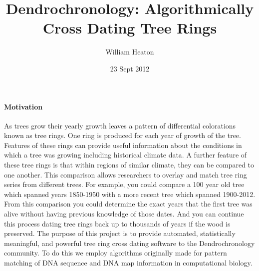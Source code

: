 \documentclass[11pt]{article}
\title{Dendrochronology: Algorithmically Cross Dating Tree Rings}
\date{23 Sept 2012} %
\author{William Heaton}
\begin{document}
\maketitle
\paragraph{Motivation\newline}
\par{
As trees grow their yearly growth leaves a pattern of differential colorations known as tree rings. One ring is produced for each year of growth of the tree. Features of these rings can provide useful information about the conditions in which a tree was growing including historical climate data. A further feature of these tree rings is that within regions of similar climate, they can be compared to one another.  This comparison allows researchers to overlay and match tree ring series from different trees.  For example, you could compare a 100 year old tree which spanned years 1850-1950 with a more recent tree which spanned 1900-2012.  From this comparison you could determine the exact years that the first tree was alive without having previous knowledge of those dates. And you can continue this process dating tree rings back up to thousands of years if the wood is preserved. The purpose of this project is to provide automated, statistically meaningful, and powerful tree ring cross dating software to the Dendrochronology community.  To do this we employ algorithms originally made for pattern matching of DNA sequence and DNA map information in computational biology.
}
\end{document}

